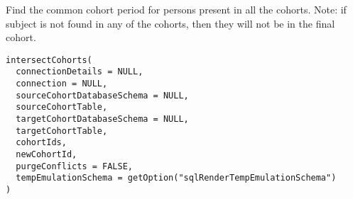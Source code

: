 \documentclass[a4paper]{book}
\begin{document}
%
\begin{Description}\relax
Find the common cohort period for persons present in all the cohorts. Note: if
subject is not found in any of the cohorts, then they will not
be in the final cohort.

\strong{[Stable]}
\end{Description}
%
\begin{Usage}
\begin{verbatim}
intersectCohorts(
  connectionDetails = NULL,
  connection = NULL,
  sourceCohortDatabaseSchema = NULL,
  sourceCohortTable,
  targetCohortDatabaseSchema = NULL,
  targetCohortTable,
  cohortIds,
  newCohortId,
  purgeConflicts = FALSE,
  tempEmulationSchema = getOption("sqlRenderTempEmulationSchema")
)
\end{verbatim}
\end{Usage}
%
\end{document}
